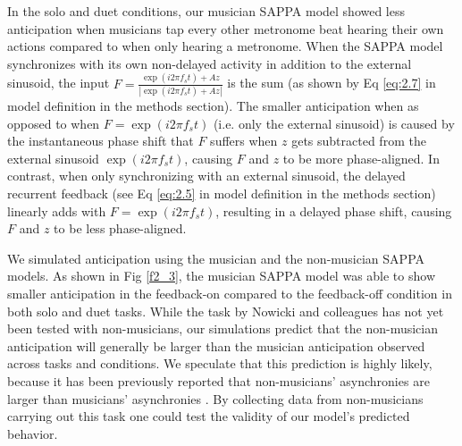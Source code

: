 \documentclass{report}
\begin{document}
In the solo and duet conditions, our musician SAPPA model showed less anticipation when musicians tap every other metronome beat hearing their own actions compared to when only hearing a metronome. When the SAPPA model synchronizes with its own non-delayed activity in addition to the external sinusoid, the input $F = \frac{\exp(i2\pi f_s t)+Az}{|\exp(i2\pi f_s t)+Az|}$ is the sum (as shown by Eq \eqref{eq:2.7} in model definition in the methods section). The smaller anticipation when as opposed to when $F = \exp(i2\pi f_s t)$ (i.e. only the external sinusoid) is caused by the instantaneous phase shift that $F$ suffers when $z$ gets subtracted from the external sinusoid $\exp(i2\pi f_s t)$, causing $F$ and $z$ to be more phase-aligned. In contrast, when only synchronizing with an external sinusoid, the delayed recurrent feedback (see Eq \eqref{eq:2.5} in model definition in the methods section) linearly adds with $F = \exp(i2\pi f_s t)$, resulting in a delayed phase shift, causing $F$ and $z$ to be less phase-aligned.

We simulated anticipation using the musician and the non-musician SAPPA models. As shown in Fig \ref{f2_3}, the musician SAPPA model was able to show smaller anticipation in the feedback-on compared to the feedback-off condition in both solo and duet tasks. While the task by Nowicki and colleagues \cite{nowicki2013mutual} has not yet been tested with non-musicians, our simulations predict that the non-musician anticipation will generally be larger than the musician anticipation observed across tasks and conditions. We speculate that this prediction is highly likely, because it has been previously reported that non-musicians' asynchronies are larger than musicians' asynchronies \cite{repp2007tapping}. By collecting data from non-musicians carrying out this task one could test the validity of our model's predicted behavior.
\end{document}
